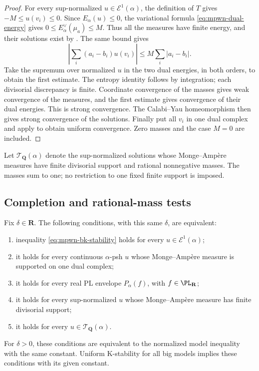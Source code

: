 \begin{proof}
For every sup-normalized $u\in\mathcal E^1(\alpha)$, the definition
of $T$ gives $-M\leq u(v_i)\leq0$. Since $E_\alpha(u)\leq0$,
the variational formula \eqref{eq:mpwn-dual-energy} gives
$0\leq E_\alpha^\vee(\mu_a)\leq M$. Thus all the measures have
finite energy, and their solutions exist by .
The same bound gives
\[
 \left|\sum_i(a_i-b_i)u(v_i)\right|
          \leq M\sum_i|a_i-b_i|.
\]
Take the supremum over normalized $u$ in the two dual energies,
in both orders, to obtain the first estimate. The entropy identity
follows by integration; each divisorial discrepancy is finite.
Coordinate convergence of the masses gives weak convergence of
the measures, and the first estimate gives convergence of their
dual energies. This is strong convergence. The Calabi--Yau
homeomorphism then gives strong convergence of the solutions.
Finally put all $v_i$ in one dual complex and apply
 to obtain uniform
convergence. Zero masses and the case $M=0$ are included.
\end{proof}

Let $\mathcal T_{\mathbf Q}(\alpha)$ denote the sup-normalized
solutions whose Monge--Amp\`ere measures have finite divisorial
support and rational nonnegative masses. The masses sum to one;
no restriction to one fixed finite support is imposed.

\subsection{Completion and rational-mass tests}
\label{subsec:mpwn-k-rational-tests}

\noindent\begin{minipage}{\linewidth}
\begin{theorem}\label{thm:mpwn-model-e1-equivalence}
Fix $\delta\in\mathbf R$. The following conditions, with this
same $\delta$, are equivalent:
\begin{enumerate}
\item inequality \eqref{eq:mpwn-bk-stability} holds for every
      $u\in\mathcal E^1(\alpha)$;
\item it holds for every continuous $\alpha$-psh $u$ whose
      Monge--Amp\`ere measure is supported on one dual complex;
\item it holds for every real PL envelope $P_\alpha(f)$,
      with $f\in\PL_{\mathbf R}$;
\item it holds for every sup-normalized $u$ whose
      Monge--Amp\`ere measure has finite divisorial support;
\item it holds for every $u\in\mathcal T_{\mathbf Q}(\alpha)$.
\end{enumerate}
For $\delta>0$, these conditions are equivalent to the normalized
model inequality with the same constant. Uniform K-stability for
all big models implies these conditions with its given constant.
\end{theorem}
\end{minipage}\par

